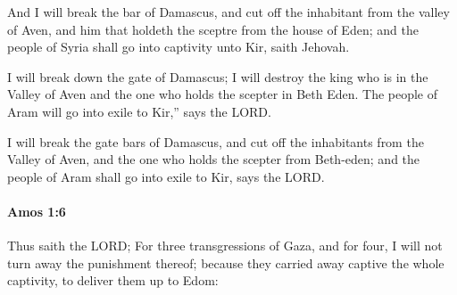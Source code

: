 			\begin{versebox}
					\item[BHS] 
					\item[LXX] 
					\item[ASV] And I will break the bar of Damascus, and cut off the inhabitant from the valley of Aven, and him that holdeth the sceptre from the house of Eden; and the people of Syria shall go into captivity unto Kir, saith Jehovah.
					\item[NIV] I will break down the gate of Damascus; I will destroy the king who is in the Valley of Aven and the one who holds the scepter in Beth Eden. The people of Aram will go into exile to Kir,” says the LORD.
					\item[NRSV] I will break the gate bars of Damascus, and cut off the inhabitants from the Valley of Aven, and the one who holds the scepter from Beth-eden; and the people of Aram shall go into exile to Kir, says the LORD.
			\end{versebox}

		\paragraph{Amos 1:6} %
			\label{AMOS-1-6}

			Thus saith the LORD; For three transgressions of Gaza, and for four, I will not turn away the punishment thereof; because they carried away captive the whole captivity, to deliver them up to Edom:

